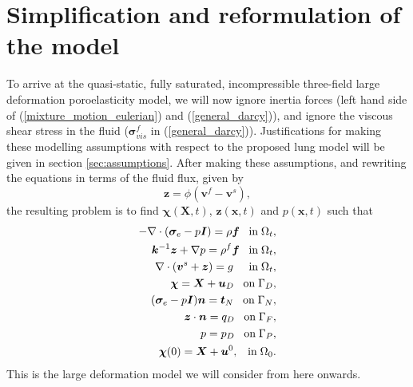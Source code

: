 \section{Simplification and reformulation of the model}
To arrive at the quasi-static, fully saturated, incompressible three-field large deformation poroelasticity model, we will now ignore inertia forces (left hand side of (\ref{mixture_motion_eulerian}) and (\ref{general_darcy})), and ignore the viscous shear stress in the fluid ($\boldsymbol{\sigma}_{vis}^{f}$ in  (\ref{general_darcy})). Justifications for making these modelling assumptions with respect to the proposed lung model will be given in section \ref{sec:assumptions}. After making these assumptions, and rewriting the equations in terms of the fluid flux, given by
\begin{equation}
  \boldsymbol{z}=\phi(\boldsymbol{v}^{f}-\boldsymbol{v}^{s}),
\label{eqn:relative_fluid}
\end{equation}
the resulting problem is to find $\boldsymbol{\chi}(\boldsymbol{X},t)$,  $\boldsymbol{z}(\boldsymbol{x},t)$ and $p(\boldsymbol{x},t)$ such that
\begin{subequations}
\begin{align}
\label{eqn:mixture_momentum_reform}
-\nabla \cdot( \boldsymbol{\sigma}_{e} -p\boldsymbol{I}) = \rho\boldsymbol{f} \;\;\; \mbox{in} \; \Omega_{t},\\
\label{eqn:fluid_momentum_reform}
{\boldsymbol{k}^{-1}\boldsymbol{z}} + \nabla p =  \rho^{f}\boldsymbol{f} \;\;\; \mbox{in} \; \Omega_{t}, \\
\label{eqn:mixture_mass_reform}
\nabla \cdot (\boldsymbol{v}^{s} + \boldsymbol{z} )  = g \;\;\;\;\;\mbox{in}\;\Omega_{t},
\\
\boldsymbol{\chi} =\boldsymbol{X}+\boldsymbol{u}_{D}   \;\;\; \mbox{on}\; \Gamma_{D},
\\
(\boldsymbol{\sigma}_{e}-p\boldsymbol{I})\boldsymbol{n} = \boldsymbol{t}_{N}   \;\;\; \mbox{on}\; \Gamma_{N},
\\
\boldsymbol{z} \cdot \boldsymbol{n} = {q_{D}}   \;\;\; \mbox{on}\; \Gamma_{F},
\\
p = p_{D}   \;\;\; \mbox{on}\; \Gamma_{P},
\\
\boldsymbol{\chi}(0) = \boldsymbol{X} + \boldsymbol{u}^{0},   \;\;\;  \mbox{in}\;\Omega_{0}.
\end{align}
\label{eqn:simple_mixture_model}
\end{subequations}
This is the large deformation model we will consider from here onwards.


